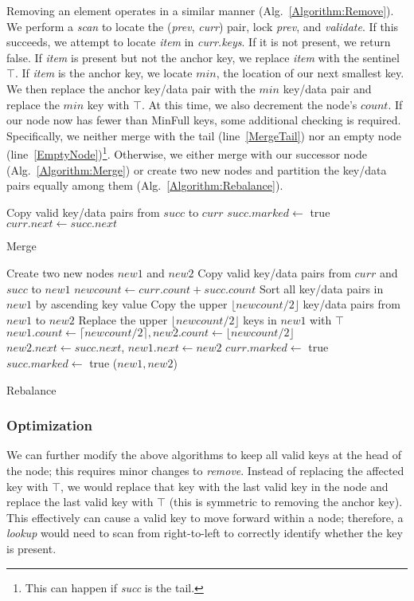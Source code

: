 \documentclass{llncs}
\begin{document}
{Removing an element operates in a similar manner (Alg.~{\ref{Algorithm:Remove}}).  
We perform a {\em scan} to locate the ({\em prev}, {\em curr}) pair, lock  
{\em prev}, and {\em validate}.
If this succeeds, we attempt to locate {\em item}
in {\em curr.keys}.  If it is not present, we return {\sc false}.  If {\em item} is
present but not the anchor key, we replace {\em item} with the sentinel $\top$.
If {\em item} is the anchor key, we locate $min$, the location of our next smallest key.  We then
replace the anchor key/data pair with the $min$ key/data pair and
replace the $min$ key with $\top$.
At this time, we also decrement
the node's $count$.  If our node now has fewer than {\sc MinFull} keys, some
additional checking is required. Specifically, we neither merge with the tail (line~\ref{MergeTail})
nor an empty node (line~\ref{EmptyNode})\footnote{This can happen if {\em succ} is the tail.}.   Otherwise,
we either merge with our successor node (Alg.~\ref{Algorithm:Merge}) 
or create two new nodes and partition the key/data pairs equally among them (Alg.~\ref{Algorithm:Rebalance}).


\begin{algorithm}
\DontPrintSemicolon
{} {
    Copy valid key/data pairs from $succ$ to $curr$ \;
    $succ.marked \leftarrow $ {\sc true} \;
    $curr.next \leftarrow succ.next$ \;
}
\caption{Merge}
\label{Algorithm:Merge}
\end{algorithm}
\begin{algorithm}
\DontPrintSemicolon
{} {
    Create two new nodes $new1$ and $new2$ \;
    Copy valid key/data pairs from $curr$ and $succ$ to $new1$ \;
    $newcount \leftarrow curr.count + succ.count$ \;
    Sort all key/data pairs in $new1$ by ascending key value \;
    Copy the upper $\lfloor newcount/2 \rfloor$ key/data pairs from $new1$ to $new2$ \;
    Replace the upper $\lfloor newcount/2 \rfloor$ keys in $new1$ with $\top$ \;
    $new1.count \leftarrow \lceil newcount/2 \rceil, new2.count \leftarrow
        \lfloor newcount/2 \rfloor$ \;
    $new2.next \leftarrow succ.next$, $new1.next \leftarrow new2$ \;
    $curr.marked \leftarrow $ {\sc true} \;
    $succ.marked \leftarrow $ {\sc true} \;
    \Return ($new1, new2$) \;
}
\caption{Rebalance}
\label{Algorithm:Rebalance}
\end{algorithm}

\subsubsection{Optimization}
We can further modify the above algorithms to keep all valid keys at the head of the node; this
requires minor changes to {\em remove}.  
Instead of replacing the affected key with $\top$, we would replace that key with the 
last valid key in the node and replace the last valid key with $\top$ (this is symmetric to
removing the anchor key).  This effectively can cause a valid key to move forward within a node;
therefore, a {\em lookup} would need to scan from right-to-left to correctly identify
whether the key is present.

}
\end{document}
